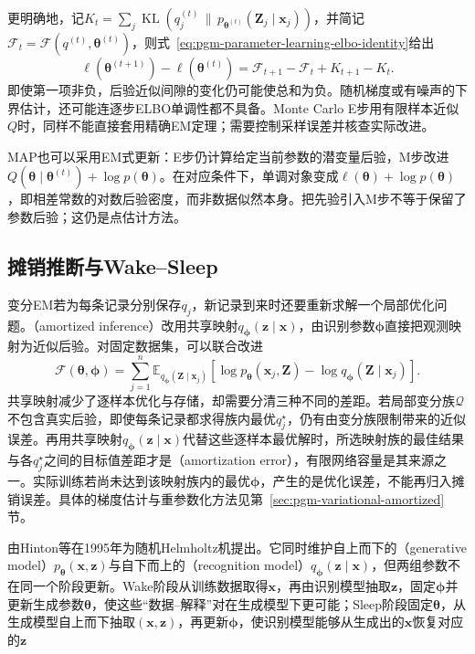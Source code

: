 更明确地，记$K_t=\sum_j\operatorname{KL}(q_j^{(t)}\,\|\,p_{\bm{\theta}^{(t)}}(\bm{Z}_j\mid\bm{x}_j))$，并简记$\mathcal{F}_t=\mathcal{F}(q^{(t)},\bm{\theta}^{(t)})$，则式~\eqref{eq:pgm-parameter-learning-elbo-identity}给出
\[
  \ell(\bm{\theta}^{(t+1)})-\ell(\bm{\theta}^{(t)})
  =\mathcal{F}_{t+1}-\mathcal{F}_t+K_{t+1}-K_t.
\]
即使第一项非负，后验近似间隙的变化仍可能使总和为负。随机梯度或有噪声的下界估计，还可能连逐步ELBO单调性都不具备。Monte Carlo E步用有限样本近似$Q$时，同样不能直接套用精确EM定理；需要控制采样误差并核查实际改进。

MAP也可以采用EM式更新：E步仍计算给定当前参数的潜变量后验，M步改进$Q(\bm{\theta}\mid\bm{\theta}^{(t)})+\log p(\bm{\theta})$。在对应条件下，单调对象变成$\ell(\bm{\theta})+\log p(\bm{\theta})$，即相差常数的对数后验密度，而非数据似然本身。把先验引入M步不等于保留了参数后验；这仍是点估计方法。

\subsection{摊销推断与Wake--Sleep}
\label{sec:pgm-parameter-learning-amortized}

变分EM若为每条记录分别保存$q_j$，新记录到来时还要重新求解一个局部优化问题。（amortized inference）改用共享映射$q_{\bm{\phi}}(\bm{z}\mid\bm{x})$，由识别参数$\bm{\phi}$直接把观测映射为近似后验。对固定数据集，可以联合改进
\[
  \mathcal{F}(\bm{\theta},\bm{\phi})
  =\sum_{j=1}^n\mathbb{E}_{q_{\bm{\phi}}(\bm{Z}\mid\bm{x}_j)}
    [\log p_{\bm{\theta}}(\bm{x}_j,\bm{Z})
     -\log q_{\bm{\phi}}(\bm{Z}\mid\bm{x}_j)].
\]
共享映射减少了逐样本优化与存储，却需要分清三种不同的差距。若局部变分族$\mathcal{Q}$不包含真实后验，即使每条记录都求得族内最优$q_j^\star$，仍有由变分族限制带来的近似误差。再用共享映射$q_{\bm{\phi}}(\bm{z}\mid\bm{x})$代替这些逐样本最优解时，所选映射族的最佳结果与各$q_j^\star$之间的目标值差距才是（amortization error），有限网络容量是其来源之一。实际训练若尚未达到该映射族内的最优$\bm{\phi}$，产生的是优化误差，不能再归入摊销误差。具体的梯度估计与重参数化方法见第~\ref{sec:pgm-variational-amortized}节。

由Hinton等在1995年为随机Helmholtz机提出。它同时维护自上而下的（generative model）$p_{\bm{\theta}}(\bm{x},\bm{z})$与自下而上的（recognition model）$q_{\bm{\phi}}(\bm{z}\mid\bm{x})$，但两组参数不在同一个阶段更新。Wake阶段从训练数据取得$\bm{x}$，再由识别模型抽取$\bm{z}$，固定$\bm{\phi}$并更新生成参数$\bm{\theta}$，使这些“数据--解释”对在生成模型下更可能；Sleep阶段固定$\bm{\theta}$，从生成模型自上而下抽取$(\bm{x},\bm{z})$，再更新$\bm{\phi}$，使识别模型能够从生成出的$\bm{x}$恢复对应的$\bm{z}$

